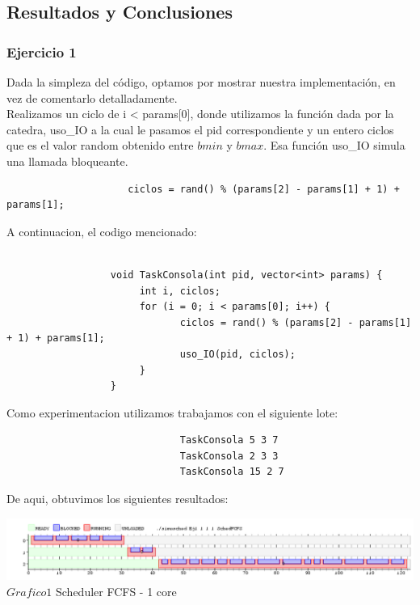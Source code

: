 \subsection{Resultados y Conclusiones}

\subsubsection[Resolución Ejercicio 1]{Ejercicio 1}

\indent Dada la simpleza del código, optamos por mostrar nuestra implementación, en vez de comentarlo detalladamente.\\
\indent Realizamos un ciclo de i < params[0], donde utilizamos la función dada por la catedra, uso\_IO a la cual le pasamos
el pid correspondiente y un entero ciclos que es el valor random obtenido entre $bmin$ y $bmax$. Esa función uso\_IO simula una llamada bloqueante.
\begin{center}
 \begin{verbatim}
                     ciclos = rand() % (params[2] - params[1] + 1) + params[1];
 \end{verbatim}

\end{center}

\indent A continuacion, el codigo mencionado:

\begin{verbatim}

                  void TaskConsola(int pid, vector<int> params) {
                       int i, ciclos;              
                       for (i = 0; i < params[0]; i++) {
                              ciclos = rand() % (params[2] - params[1] + 1) + params[1];  
                              uso_IO(pid, ciclos);
                       }
                  } 

\end{verbatim}

\indent Como experimentacion utilizamos trabajamos con el siguiente lote:\\

\begin{verbatim}
                              TaskConsola 5 3 7
                              TaskConsola 2 3 3
                              TaskConsola 15 2 7
\end{verbatim}

De aqui, obtuvimos los siguientes resultados:\\

\vspace*{0.3cm} \vspace*{0.3cm}
  \begin{center}
 \includegraphics[scale=0.5]{./Test/ej1.png}
 { $Grafico 1$ Scheduler FCFS - 1 core }
 \end{center}
  \vspace*{0.3cm}



